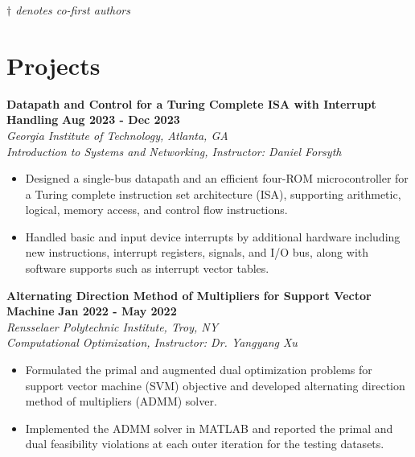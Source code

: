 \documentclass[letterpaper, 11pt]{article}
\newcommand{\subsectionvspace}{\vspace{6pt}}
\begin{document}
    \subsectionvspace

    \textit{$\dag$ denotes co-first authors}


\section{Projects}


    \textbf{Datapath and Control for a Turing Complete ISA with Interrupt Handling} \hfill
    \textbf{Aug 2023 - Dec 2023} \\
    \textit{Georgia Institute of Technology, Atlanta, GA} \\
    \textit{Introduction to Systems and Networking, Instructor: Daniel Forsyth}
    \begin{itemize}
        \item Designed a single-bus datapath and an efficient four-ROM microcontroller for a Turing complete instruction set architecture (ISA), supporting arithmetic, logical, memory access, and control flow instructions.
        \item Handled basic and input device interrupts by additional hardware including new instructions, interrupt registers, signals, and I/O bus, along with software supports such as interrupt vector tables.
    \end{itemize}

    \subsectionvspace

    \textbf{Alternating Direction Method of Multipliers for Support Vector Machine} \hfill 
    \textbf{Jan 2022 - May 2022} \\
    \textit{Rensselaer Polytechnic Institute, Troy, NY} \\
    \textit{Computational Optimization, Instructor: Dr. Yangyang Xu}
    \begin{itemize}
        \item Formulated the primal and augmented dual optimization problems for support vector machine (SVM) objective and developed alternating direction method of multipliers (ADMM) solver.
        \item Implemented the ADMM solver in MATLAB and reported the primal and dual feasibility violations at each outer iteration for the testing datasets.
    \end{itemize}

\end{document}
